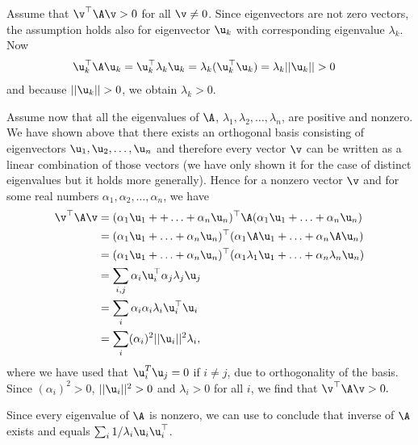 \begin{exenumerate}
  \begin{solution}

    Assume that $\v^\top \A\v > 0$ for all $\v \neq 0$. Since eigenvectors are not
    zero vectors, the assumption holds also for eigenvector $\u_k$ with
    corresponding eigenvalue $\lambda_k$. Now
    \begin{align}
      \u_k^\top \A\u_k &= \u_k^\top\lambda_k\u_k = \lambda_k(\u_k^\top\u_k) = \lambda_k||\u_k|| > 0
    \end{align}
    and because $||\u_k|| > 0$, we obtain $\lambda_k > 0$.

    Assume now that all the eigenvalues of $\A$, $\lambda_1, \lambda_2, \ldots, \lambda_n$, are positive and nonzero. We have shown above that there exists an orthogonal basis consisting of eigenvectors $\u_1, \u_2, \ldots, \u_n$ and therefore every vector $\v$ can be written as a
    linear combination of those vectors (we have only shown it for the case of distinct eigenvalues but it holds more generally). Hence for a nonzero vector $\v$ and for some real numbers $\alpha_1, \alpha_2, \ldots, \alpha_n$, we have
    \begin{align}
      \v^\top\A\v &= (\alpha_1\u_1 + + \ldots + \alpha_n\u_n)^\top \A(\alpha_1\u_1 + \ldots + \alpha_n\u_n) \\
                  &= (\alpha_1\u_1 + \ldots + \alpha_n\u_n)^\top(\alpha_1\A\u_1 + \ldots + \alpha_n\A\u_n) \\
                  &= (\alpha_1\u_1 + \ldots + \alpha_n\u_n)^\top(\alpha_1\lambda_1\u_1 + \ldots + \alpha_n\lambda_n\u_n) \\
                  &= \sum_{i,j} \alpha_i\u_i^\top\alpha_j\lambda_j\u_j \\
                  &= \sum_i \alpha_i\alpha_i\lambda_i\u_i^\top\u_i \\
                  &= \sum_i (\alpha_i)^2||\u_i||^2\lambda_i,
    \end{align}
    where we have used that $\u_i^T\u_j = 0$ if $i \neq j$, due to orthogonality of the basis. Since $(\alpha_i)^2 > 0$, $||\u_i||^2 > 0$ and $\lambda_i > 0$ for all $i$, we find that $\v^\top\A\v > 0.$

    Since every eigenvalue of $\A$ is nonzero, we can use  to conclude that inverse of $\A$ exists and equals $\sum_i 1/\lambda_i \u_i \u_i^\top$.

  \end{solution}

\end{exenumerate}


